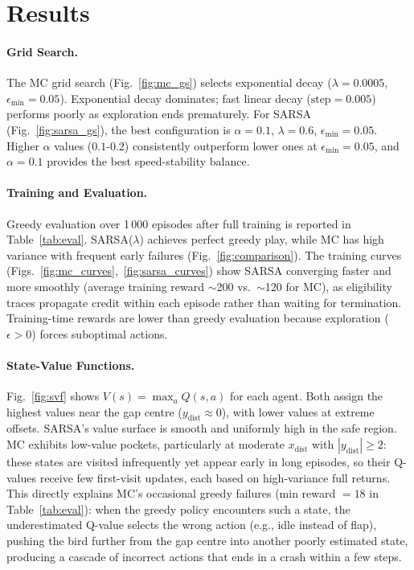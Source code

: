 \documentclass[runningheads]{llncs}
\begin{document}
\section{Results}
\paragraph{Grid Search.} The MC grid search (Fig.~\ref{fig:mc_gs}) selects exponential decay ($\lambda=0.0005$, $\epsilon_{\min}=0.05$). Exponential decay dominates; fast linear decay ($\text{step}=0.005$) performs poorly as exploration ends prematurely. For SARSA (Fig.~\ref{fig:sarsa_gs}), the best configuration is $\alpha=0.1$, $\lambda=0.6$, $\epsilon_{\min}=0.05$. Higher $\alpha$ values ($0.1$-$0.2$) consistently outperform lower ones at $\epsilon_{\min}=0.05$, and $\alpha=0.1$ provides the best speed-stability balance.

\paragraph{Training and Evaluation.} Greedy evaluation over 1\,000 episodes after full training is reported in Table~\ref{tab:eval}. SARSA($\lambda$) achieves perfect greedy play, while MC has high variance with frequent early failures (Fig.~\ref{fig:comparison}). The training curves (Figs.~\ref{fig:mc_curves},~\ref{fig:sarsa_curves}) show SARSA converging faster and more smoothly (average training reward $\sim$200 vs.\ $\sim$120 for MC), as eligibility traces propagate credit within each episode rather than waiting for termination. Training-time rewards are lower than greedy evaluation because exploration ($\epsilon > 0$) forces suboptimal actions.

\paragraph{State-Value Functions.} Fig.~\ref{fig:svf} shows $V(s) = \max_a Q(s,a)$ for each agent. Both assign the highest values near the gap centre ($y_\text{dist} \approx 0$), with lower values at extreme offsets. SARSA's value surface is smooth and uniformly high in the safe region. MC exhibits low-value pockets, particularly at moderate $x_\text{dist}$ with $|y_\text{dist}|\geq 2$: these states are visited infrequently yet appear early in long episodes, so their Q-values receive few first-visit updates, each based on high-variance full returns. This directly explains MC's occasional greedy failures (min reward $= 18$ in Table~\ref{tab:eval}): when the greedy policy encounters such a state, the underestimated Q-value selects the wrong action (e.g., idle instead of flap), pushing the bird further from the gap centre into another poorly estimated state, producing a cascade of incorrect actions that ends in a crash within a few steps.
\end{document}
